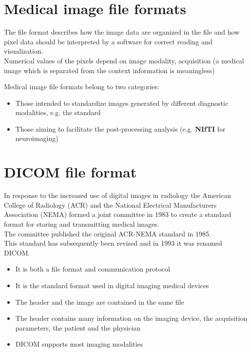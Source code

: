 \section{Medical image file formats}

The file format describes how the image data are organized in the file and how pixel data should be interpreted by a software for correct reading and visualization.\\
Numerical values of the pixels depend on image modality, acquisition (a medical image which is separated from the context information is meaningless)

Medical image file formats belong to two categories:
\begin{itemize}
	\item Those intended to standardize images generated by different diagnostic modalities, e.g. the \textbf{ } standard
	\item Those aiming to facilitate the post-processing analysis (e.g. \textbf{NIfTI} for neuroimaging)
\end{itemize}

\section{DICOM file format}
In response to the increased use of digital images in radiology the American College of Radiology (ACR) and the National Electrical Manufacturers Association (NEMA) formed a joint committee in 1983 to create a standard format for storing and transmitting medical images.\\
The committee published the original ACR-NEMA standard in 1985.\\
This standard has subsequently been revised and in 1993 it was renamed DICOM.

\begin{tcolorbox}[width=\textwidth,colback={white},title={\textbf{Di}gital Imaging and \textbf{CO}mmunication in \textbf{M}edicine (\textbf{DICOM}): },colbacktitle=cyan,coltitle=black]
	\begin{itemize}
		\item It is both a file format and communication protocol
		\item It is the standard format used in digital imaging medical devices
		\item The header and the image are contained in the same file
		\item The header contains many information on the imaging device, the acquisition parameters, the patient and the physician
		\item DICOM supports most imaging modalities
	\end{itemize}
\end{tcolorbox}


